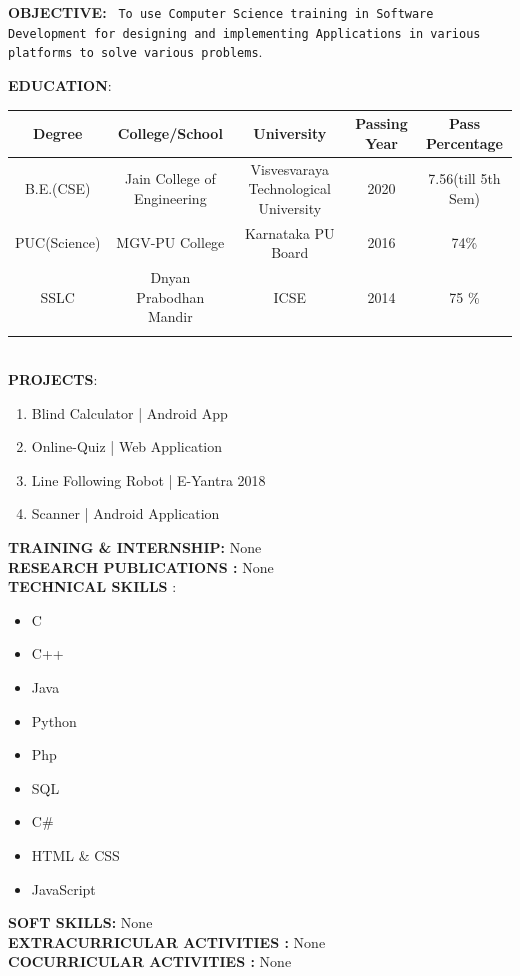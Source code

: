 \documentclass{article}
\begin{document}
		
\large \textbf{OBJECTIVE:}
	\texttt{	
	To use Computer Science training in Software Development for designing and implementing Applications in various platforms to solve various problems}.
\vspace{\baselineskip}
	
	\large \textbf{EDUCATION}:
	
	\begin{tabular}{|c|c|c|c|c|}
	\small Degree & \small College/School & \small University & \small Passing Year & \small Pass Percentage \\
		\hline
		\footnotesize  B.E.(CSE)  & \footnotesize Jain College of Engineering & \footnotesize Visvesvaraya Technological University & \footnotesize 2020 & \footnotesize 7.56(till 5th Sem) \\
		\footnotesize PUC(Science) & \footnotesize MGV-PU College & \footnotesize Karnataka PU Board & \footnotesize 2016 &\footnotesize 74\%  \\
		\footnotesize SSLC & \footnotesize Dnyan Prabodhan Mandir & \footnotesize ICSE & \footnotesize 2014 & \footnotesize 75 \%  \\

\vspace{\baselineskip}
	\end{tabular}
\\
	\large \textbf{PROJECTS}:
	\begin{enumerate}
		\item Blind Calculator | Android App
		\item Online-Quiz | Web Application
		\item Line Following Robot | E-Yantra 2018
		\item Scanner | Android Application
		
		\vspace{\baselineskip}
	\end{enumerate}
	\large \textbf{TRAINING \&
		INTERNSHIP:}	
	None
	\\
	\large \textbf{RESEARCH PUBLICATIONS :}	
	None
	\\
	\large \textbf{TECHNICAL SKILLS
}:
	\begin{itemize}
		\item C
		\item C++
		\item Java
		\item Python
		\item Php
		\item SQL
		\item C\#
		\item HTML \& CSS
		\item JavaScript
	\end{itemize}
\large \textbf{SOFT SKILLS:}	
None
\\
\large \textbf{EXTRACURRICULAR ACTIVITIES
:}	
None
\\
\large \textbf{COCURRICULAR ACTIVITIES
:}	
None
\\
	
\end{document}
